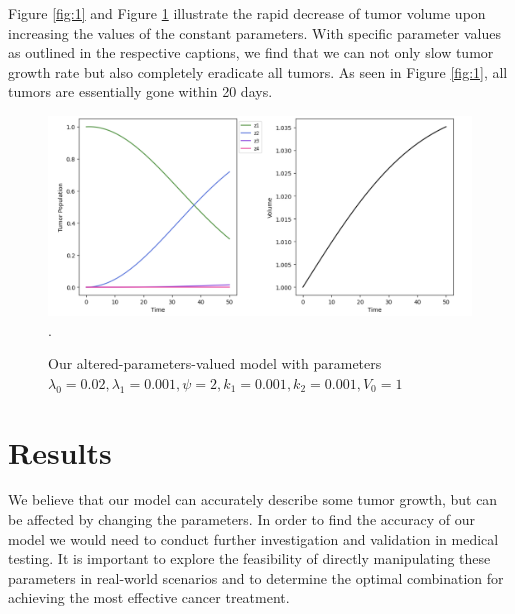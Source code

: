 \documentclass[11pt,reqno]{amsart}
\begin{document}
Figure \ref{fig:1} and Figure \ref{fig:4} illustrate the rapid decrease of tumor volume upon increasing the values of the constant parameters. With specific parameter values as outlined in the respective captions, we find that we can not only slow tumor growth rate but also completely eradicate all tumors. As seen in Figure \ref{fig:1}, all tumors are essentially gone within 20 days.

\begin{figure}[h]
\begin{center} %
\includegraphics[width=\textwidth]{altered.png}. %
\end{center}
\caption{Our altered-parameters-valued model with parameters $\lambda_0=0.02, \lambda_1=0.001, \psi=2, k_1 = 0.001, k_2=0.001, V_0 = 1$}
\label{fig:4}
\end{figure}





\section{Results}
 We believe that our model can accurately describe some tumor growth, but can be affected by changing the parameters. In order to find the accuracy of our model we would need to conduct further investigation and validation in medical testing. It is important to explore the feasibility of directly manipulating these parameters in real-world scenarios and to determine the optimal combination for achieving the most effective cancer treatment. 

\end{document}
